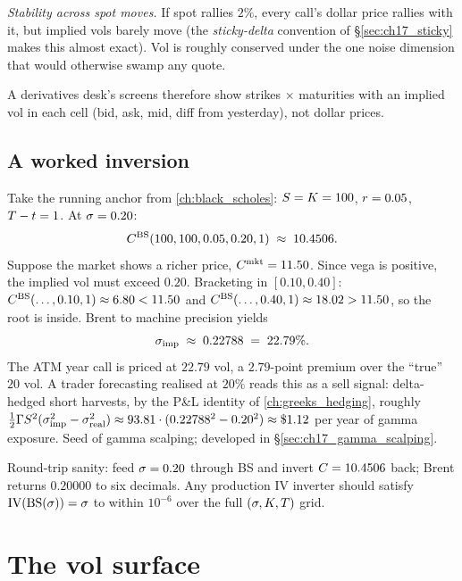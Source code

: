 \emph{Stability across spot moves.} If spot rallies $2\%$, every
call's dollar price rallies with it, but implied vols barely move
(the \emph{sticky-delta} convention of \S\ref{sec:ch17_sticky}
makes this almost exact). Vol is roughly conserved under the one
noise dimension that would otherwise swamp any quote.

A derivatives desk's screens therefore show strikes $\times$
maturities with an implied vol in each cell (bid, ask, mid, diff
from yesterday), not dollar prices.

\subsection{A worked inversion}
\label{subsec:ch17_worked_iv}

Take the running anchor from \cref{ch:black_scholes}:
$S = K = 100$, $r = 0.05$, $T - t = 1$. At
$\sigma = 0.20$:
\begin{equation*}
  C^{\text{BS}}(100, 100, 0.05, 0.20, 1) \;\approx\; 10.4506.
\end{equation*}
Suppose the market shows a richer price,
$C^{\text{mkt}} = 11.50$. Since vega is positive, the implied
vol must exceed $0.20$. Bracketing in $[0.10, 0.40]$:
$C^{\text{BS}}(\ldots,0.10,1) \approx 6.80 < 11.50$ and
$C^{\text{BS}}(\ldots,0.40,1) \approx 18.02 > 11.50$, so the
root is inside. Brent to machine precision yields
\begin{equation*}
  \sigma_{\text{imp}} \;\approx\; 0.22788 \;=\; 22.79\%.
\end{equation*}
The ATM year call is priced at $22.79$ vol, a $2.79$-point premium
over the ``true'' $20$ vol. A trader forecasting realised at
$20\%$ reads this as a sell signal: delta-hedged short harvests,
by the P\&L identity of \cref{ch:greeks_hedging}, roughly
$\tfrac12 \Gamma S^2 (\sigma_{\text{imp}}^2 -
\sigma_{\text{real}}^2) \approx 93.81 \cdot (0.22788^2 - 0.20^2)
\approx \$1.12$ per year of gamma exposure. Seed of gamma
scalping; developed in \S\ref{sec:ch17_gamma_scalping}.

Round-trip sanity: feed $\sigma = 0.20$ through BS and invert
$C = 10.4506$ back; Brent returns $0.20000$ to six decimals.
Any production IV inverter should satisfy
$\text{IV}(\text{BS}(\sigma)) = \sigma$ to within $10^{-6}$ over
the full $(\sigma, K, T)$ grid.

\section{The vol surface}
\label{sec:ch17_surface}

